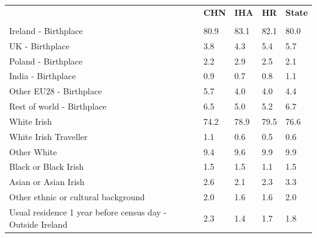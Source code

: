 \documentclass{article}
\begin{document}
\pagebreak
\begin{table}[h]	
\centering
		\begin{tabular}{KTTTT}
  \hline
& \textbf{CHN} & \textbf{IHA} & \textbf{HR}& \textbf{State}\\ 
  \hline
    \\ 
    \hline
Ireland - Birthplace & 80.9& 83.1& 82.1& 80.0\\
UK - Birthplace & 3.8& 4.3& 5.4& 5.7\\
Poland - Birthplace & 2.2& 2.9& 2.5& 2.1\\
India - Birthplace & 0.9& 0.7& 0.8& 1.1\\
Other EU28 - Birthplace & 5.7& 4.0& 4.0& 4.4\\
Rest of world - Birthplace & 6.5& 5.0& 5.2& 6.7\\
    \hline
White Irish & 74.2& 78.9& 79.5& 76.6\\
White Irish Traveller & 1.1& 0.6& 0.5& 0.6\\
Other White & 9.4& 9.6& 9.9& 9.9\\
Black or Black Irish & 1.5& 1.5& 1.1& 1.5\\
Asian or Asian Irish & 2.6& 2.1& 2.3& 3.3\\
Other ethnic or cultural background & 2.0& 1.6& 1.6& 2.0\\
    \hline
Usual residence 1 year before census day - Outside Ireland & 2.3& 1.4& 1.7& 1.8\\


\end{tabular}
\end{table}
\end{document}
